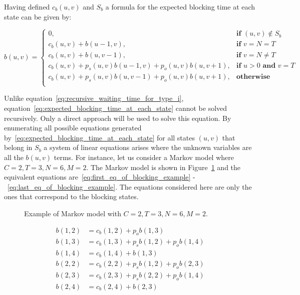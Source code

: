 Having defined \(c_b(u,v)\) and \(S_b\) a formula for the expected blocking time
at each state can be given by:

\small
\begin{equation}\label{eq:expected_blocking_time_at_each_state}
    b(u,v) =
    \begin{cases}
        0, & \textbf{if } (u,v) \notin S_b \\
        c_b(u,v) + b(u - 1, v), & \textbf{if } v = N = T\\
        c_b(u,v) + b(u, v-1), & \textbf{if } v = N \neq T \\
        c_b(u,v) + p_s(u,v) b(u-1, v) + p_o(u,v) b(u, v+1), & \textbf{if } u > 0
        \textbf{ and } v = T \\
        c_b(u,v) + p_s(u,v) b(u, v-1) + p_o(u,v) b(u, v+1), & \textbf{otherwise} \\
    \end{cases}
\end{equation}
\normalsize

Unlike equation~\eqref{eq:recursive_waiting_time_for_type_i},
equation~\eqref{eq:expected_blocking_time_at_each_state} cannot be solved
recursively.
Only a direct approach will be used to solve this equation.
By enumerating all possible equations generated
by~\eqref{eq:expected_blocking_time_at_each_state} for all states \((u,v)\) that
belong in \(S_b\) a system of linear equations arises where the unknown
variables are all the \(b(u,v)\) terms.
For instance, let us consider a Markov model where \(C=2, T=3, N=6, M=2\).
The Markov model is shown in Figure~\ref{fig:example_algeb_blocking}
and the equivalent equations are~\eqref{eq:first_eq_of_blocking_example}
-~\eqref{eq:last_eq_of_blocking_example}.
The equations considered here are only the ones that correspond to the blocking
states.

\begin{minipage}{0.45\textwidth}
    \begin{figure}[H]
        \scalebox{0.5}{}
        \caption{Example of Markov model with \(C=2, T=3, N=6, M=2\).}
        \label{fig:example_algeb_blocking}
    \end{figure}
\end{minipage}
\begin{minipage}{0.5\textwidth}
    \scriptsize
    \begin{align}
        b(1,2) &= c_b(1,2) + p_o b(1,3) \label{eq:first_eq_of_blocking_example} \\
        b(1,3) &= c_b(1,3) + p_s b(1,2) + p_o b(1,4) \\
        b(1,4) &= c_b(1,4) + b(1,3) \\
        b(2,2) &= c_b(2,2) + p_s b(1,2) + p_o b(2,3) \\
        b(2,3) &= c_b(2,3) + p_s b(2,2) + p_o b(1,4) \\
        b(2,4) &= c_b(2,4) + b(2,3)\label{eq:last_eq_of_blocking_example}
    \end{align}
    \normalsize
\end{minipage}
\vspace{0.5cm}

